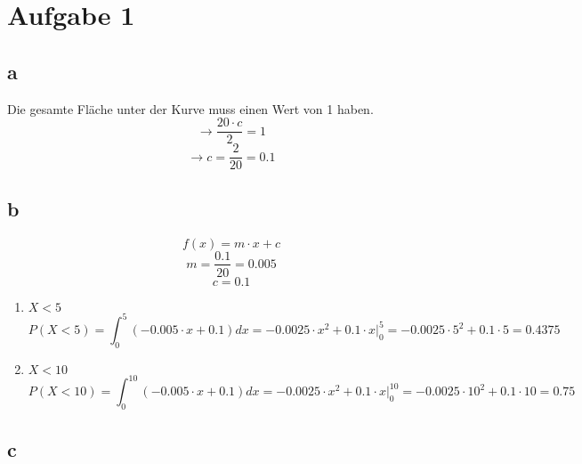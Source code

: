 

\section{Aufgabe 1}

\subsection{a}
Die gesamte Fläche unter der Kurve muss einen Wert von 1 haben. 
\[ \rightarrow \frac{20 \cdot c}{2} = 1 \]
\[ \rightarrow c = \frac{2}{20} = 0.1 \]

\subsection{b}
\[ f(x) = m \cdot x + c \]
\[ m = \frac{0.1}{20} = 0.005 \]
\[ c = 0.1 \]
\begin{enumerate}
  \item $X < 5$
  \[ P(X<5) = \int_0^{5}(-0.005 \cdot x + 0.1)dx 
  = -0.0025 \cdot x^2 + 0.1 \cdot x |_0^{5} 
  = -0.0025 \cdot 5^2 + 0.1 \cdot 5 = 0.4375 \]
  \item $X < 10$
  \[ P(X<10) = \int_0^{10}(-0.005 \cdot x + 0.1)dx 
  = -0.0025 \cdot x^2 + 0.1 \cdot x |_0^{10} 
  = -0.0025 \cdot 10^2 + 0.1 \cdot 10 = 0.75 \]
\end{enumerate}

\subsection{c}
\begin{center}
\end{center}

